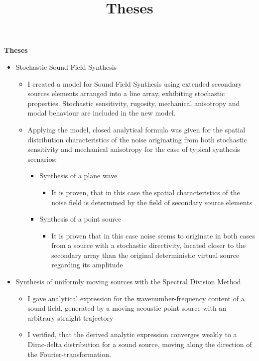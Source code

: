\documentclass[a4paper,10pt]{article}
\title{Theses}
\date{}
\begin{document}
\begin{center}
  \textbf{\Large Theses}\\[0.5cm]
\end{center}

\begin{itemize}
\item Stochastic Sound Field Synthesis
	\begin{itemize}
	\item I created a model for Sound Field Synthesis using extended secondary sources elements arranged into a line array, exhibiting stochastic properties. Stochastic sensitivity, rugosity, mechanical anisotropy and modal behaviour are included in the new model.
	\item Applying the model, closed analytical formula was given for the spatial distribution characteristics of the noise originating from both stochastic sensitivity and mechanical 	anisotropy for the case of typical synthesis scenarios:
	\begin{itemize}
	\item Synthesis of a plane wave
		\begin{itemize}
		\item It is proven, that in this case the spatial characteristics of the noise field is determined by the field of secondary source elements
		\end{itemize}
	\item Synthesis of a point source	
		\begin{itemize}
		\item It is proven that in this case noise seems to originate in both cases from a source with a stochastic directivity, located closer to the secondary array than the original deterministic virtual source regarding its amplitude
		\end{itemize}
	\end{itemize}
	\end{itemize}
\item Synthesis of uniformly moving sources with the Spectral Division Method
	\begin{itemize}
	\item I gave analytical expression for the wavenumber-frequency content of a sound field, generated by a moving acoustic point source with an arbitrary straight trajectory
	\item I verified, that the derived analytic expression converges weakly to a Dirac-delta distribution for a sound source, moving along the direction of the Fourier-transformation.

\end{itemize}
\end{itemize}
\end{document}
